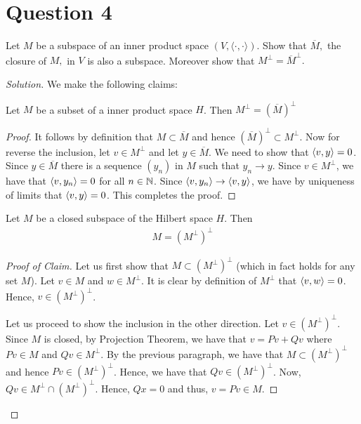 \section{Question 4}
\horz
Let $M$ be a subspace of an inner product space $(V,\langle \cdot, \cdot \rangle).$ Show that $\overline{M},$ the closure of $M,$ in $V$ is also a subspace. Moreover show that $M^{\perp}= {\overline{M}}^{\perp}.$
\horz
\begin{proof}[Solution] We make the following claims:

\begin{claim}
    Let $M$ be a subset of a inner product space $H$. Then $M^{\perp} =  \left( \overline{M} \right)^{\perp}$
\end{claim}
\begin{proof}
    It follows by definition that $M \subset \overline M$ and hence $\left( \overline M \right)^{\perp} \subset M^{\perp}$. Now for reverse the inclusion, let $v \in M^{\perp}$ and let $y \in \overline M$. We need to show that $\left\langle v,y \right\rangle = 0$. Since $y\in \overline M$ there is a sequence $\left( y_{n} \right)$ in $M$ such that $y_{n} \to y$. Since $v \in M^{\perp}$, we have that $\left\langle v , y_{n} \right\rangle=0 $ for all $n\in \mathbb N$. Since $\left\langle v, y_{n} \right\rangle \to \left\langle v,y \right\rangle$, we have by uniqueness of limits that $\left\langle v,y \right\rangle = 0$. This completes the proof.
\end{proof}

\begin{claim}
    
    Let $M$ be a closed subspace of the Hilbert space $H$. Then 
    \begin{align*}
	M = \left( M^{\perp} \right) ^{\perp}
    \end{align*}
    
\label{claim:o-comp-squared}
\end{claim}
\begin{proof}[Proof of Claim]
    Let us first show that $M \subset \left( M ^{\perp} \right)^{\perp}$ (which in fact holds for any set $M$). Let $v \in M$ and $w \in M^{\perp}$. It is clear by definition of $M^{\perp}$ that $\left\langle v,w \right\rangle = 0$. Hence, $v \in \left( M^{\perp} \right)^{\perp}$.

    Let us proceed to show the inclusion in the other direction. Let $v \in \left( M^{\perp} \right)^{\perp}$. Since $M$ is closed, by Projection Theorem, we have that $v = Pv + Qv$ where $Pv \in M$ and $Qv \in M^{\perp}$. By the previous paragraph, we have that $M \subset \left( M^{\perp} \right)^{\perp}$ and hence $Pv \in \left( M^{\perp} \right) ^{\perp}$. Hence, we have that $Qv \in \left( M^{\perp} \right)^{\perp}$. Now, $Qv \in M^{\perp} \cap \left( M^{\perp} \right) ^{\perp}$. Hence, $Qx = 0$ and thus, $v=Pv \in M$.
\end{proof}


\end{proof}

